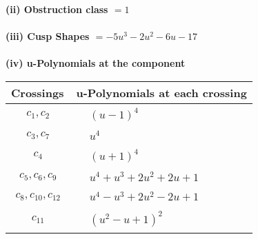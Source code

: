 \documentclass[1p]{elsarticle_modified}
\theoremstyle{definition}
\begin{document}
\flushleft \textbf{(ii) Obstruction class $= 1$}\\~\\
\flushleft \textbf{(iii) Cusp Shapes $= -5 u^3-2 u^2-6 u-17$}\\~\\
\newpage\renewcommand{\arraystretch}{1}
\flushleft \textbf{(iv) u-Polynomials at the component}\newline \\
\begin{tabular}{m{50pt}|m{274pt}}
Crossings & \hspace{64pt}u-Polynomials at each crossing \\
\hline $$\begin{aligned}c_{1},c_{2}\end{aligned}$$&$\begin{aligned}
&(u-1)^4
\end{aligned}$\\
\hline $$\begin{aligned}c_{3},c_{7}\end{aligned}$$&$\begin{aligned}
&u^4
\end{aligned}$\\
\hline $$\begin{aligned}c_{4}\end{aligned}$$&$\begin{aligned}
&(u+1)^4
\end{aligned}$\\
\hline $$\begin{aligned}c_{5},c_{6},c_{9}\end{aligned}$$&$\begin{aligned}
&u^4+u^3+2 u^2+2 u+1
\end{aligned}$\\
\hline $$\begin{aligned}c_{8},c_{10},c_{12}\end{aligned}$$&$\begin{aligned}
&u^4- u^3+2 u^2-2 u+1
\end{aligned}$\\
\hline $$\begin{aligned}c_{11}\end{aligned}$$&$\begin{aligned}
&(u^2- u+1)^2
\end{aligned}$\\
\hline
\end{tabular}\\~\\
\end{document}
